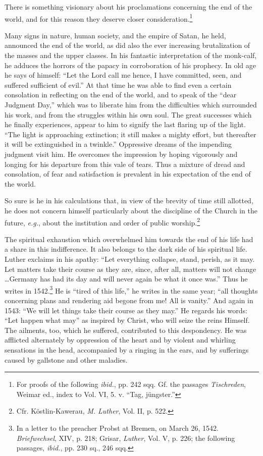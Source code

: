 There is something visionary about his proclamations concerning
the end of the world, and for this reason they deserve closer consideration.\footnote
{For proofs of the following \textit{ibid.}, pp. 242 sqq. Gf. the passages
\textit{Tischreden}, Weimar ed., index to Vol. VI, 5. v. “Tag, jüngster.”}

Many signs in nature, human society, and the empire of Satan, he
held, announced the end of the world, as did also the ever increasing
brutalization of the masses and the upper classes. In his fantastic interpretation
of the monk-calf, he adduces the horrors of the papacy
in corroboration of his prophecy. In old age he says of himself: “Let
the Lord call me hence, I have committed, seen, and suffered sufficient
of evil.” At that time he was able to find even a certain consolation
in reflecting on the end of the world, and to speak of the “dear
Judgment Day,” which was to liberate him from the difficulties which
surrounded his work, and from the struggles within his own soul. The
great successes which he finally experiences, appear to him to signify
the last flaring up of the light. “The light is approaching extinction;
it still makes a mighty effort, but thereafter it will be extinguished in
a twinkle.” Oppressive dreams of the impending judgment visit him.
He overcomes the impression by hoping vigorously and longing for his
departure from this vale of tears. Thus a mixture of dread and consolation,
of fear and satisfaction is prevalent in his expectation of the
end of the world.

So sure is he in his calculations that, in view of the brevity of time
still allotted, he does not concern himself particularly about the discipline
of the Church in the future, \textit{e.g.}, about the institution and
order of public worship.\footnote{Cfr. Köstlin-Kawerau, \textit{M. Luther}, Vol. II, p. 522.}

The spiritual exhaustion which overwhelmed him towards the end
of his life had a share in this indifference. It also belongs to the dark
side of his spiritual life. Luther exclaims in his apathy: “Let everything
collapse, stand, perish, as it may. Let matters take their course
as they are, since, after all, matters will not change \dots Germany
has had its day and will never again be what it once was.” Thus he
writes in 1542.\footnote
{In a letter to the preacher Probst at Bremen, on March 26, 1542. \textit{Briefwechsel}, XIV,
p. 218; Grisar, \textit{Luther}, Vol. V, p. 226; the following passages, \textit{ibid.}, pp. 230 sq., 246
sqq.}
He is “tired of this life,” he writes in the same year;
“all thoughts concerning plans and rendering aid begone from me!
All is vanity.” And again in 1543: “We will let things take their
course as they may.” He regards his words: “Let happen what may”
as inspired by Christ, who will seize the reins Himself. The ailments,
too, which he suffered, contributed to this despondency. He was
afflicted alternately by oppression of the heart and by violent and
whirling sensations in the head, accompanied by a ringing in the
ears, and by sufferings caused by gallstone and other maladies.

